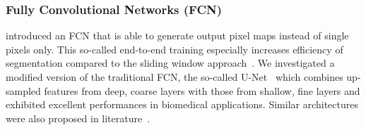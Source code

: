 \documentclass{elsarticle}
\begin{document}





\subsubsection{Fully Convolutional Networks (FCN)}\label{sec_UNet}
\cite{Long2015} introduced an FCN that is able to generate output pixel maps instead of single pixels only. This so-called end-to-end training especially increases efficiency of segmentation compared to the sliding window approach~\citep{NIPS2012_4741}.
We investigated a modified version of the traditional FCN, the so-called U-Net~\citep{myRonneberger15a} which combines up-sampled features from deep, coarse layers with those from shallow, fine layers and exhibited excellent performances in biomedical applications. Similar architectures were also proposed in literature~\citep{Girshick2014,Long2015,Seyedhosseini2013}.
\end{document}
